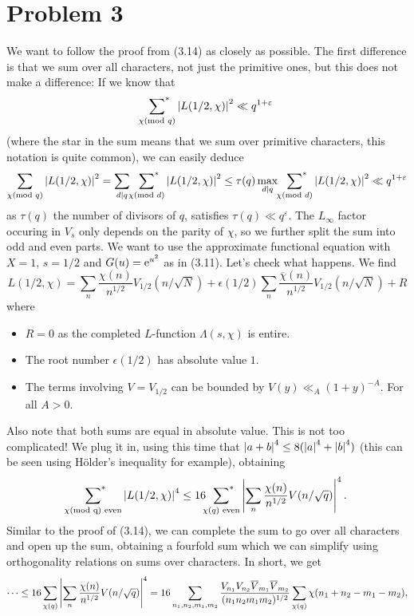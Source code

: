 \documentclass[a4paper,11pt]{article}
\begin{document}
\section*{Problem 3}
We want to follow the proof from (3.14) as closely as possible. The first 
difference is that we sum over all characters, not just the primitive ones, 
but this does not make a difference: If we know that 
\[
    \sideset{}{^*} \sum_{\chi \text{(mod $q$)}} \left\lvert L(1/2, \chi) \right\rvert^2 \ll q^{1+\varepsilon}
\]
(where the star in the sum means that we sum over primitive characters, this 
notation is quite common), we can easily deduce
\[
    \sum_{\chi \text{(mod $q$)}} \left\lvert L(1/2, \chi) \right\rvert^2 
    = \sum_{d \mid q}\sideset{}{^*} \sum_{\chi \text{(mod $d$)}} \left\lvert L(1/2, \chi) \right\rvert^2 
    \leq \tau(q) \max_{d \mid q} \sideset{}{^*} \sum_{\chi \text{(mod $d$)}} \left\lvert L(1/2, \chi) \right\rvert^2 
    \ll q^{1+\varepsilon}
\]
as $\tau(q)$ the number of divisors of $q$, satisfies $\tau(q) \ll q^{\varepsilon}$. 
The $L_\infty$ factor occuring in $V_s$ only depends on the parity of $\chi$, 
so we further split the sum into odd and even parts. We want to use the 
approximate functional equation with $X=1$, $s=1/2$ and $G(u) = \mathrm e^{u^2}$ as in 
(3.11). Let's check what happens. We find
\[
    L(1/2, \chi) = \sum_n \frac{\chi(n)}{n^{1/2}} V_{1/2}(n/\sqrt N)
    +  \epsilon({1/2})\sum_n \frac{\overline\chi(n)}{n^{1/2}} V_{1/2}(n/\sqrt N) + R
\]
where 
\begin{itemize}
    \item $R = 0$ as the completed $L$-function $\Lambda(s, \chi)$ is entire.
    \item The root number $\epsilon(1/2)$ has absolute value $1$. 
    \item The terms involving $V = V_{1/2}$ can be bounded by 
        $V(y) \ll_A (1 + y)^{-A}$. For all $A > 0$. 
\end{itemize}
Also note that both sums are equal in absolute value. This is not too
complicated! We plug it in, using this time that $\left\lvert a+b \right\rvert^4 \leq 8 (\left\lvert a \right\rvert^4 
+ \left\lvert b \right\rvert^4)$ (this can be seen using Hölder's inequality for example),
obtaining 
\[
    \sideset{}{^*} \sum_{\chi \text{(mod q) even}} \left\lvert L(1/2, \chi) \right\rvert^4 
    \leq 16 \sideset{}{^*} \sum_{\chi(q) \text{ even}} \left\lvert \sum_n
    \frac{\chi(n)}{n^{1/2}}V(n/\sqrt q) \right\rvert^4.
\]
Similar to the proof of (3.14), we can complete the sum to go over all characters 
and open up the sum, obtaining a fourfold sum which we can simplify using
orthogonality relations on sums over characters. 
In short, we get
\begin{equation}
    \dots 
    \leq 16 \sum_{\chi (q)} \left\lvert  \sum_n \frac{\chi(n)}{n^{1/2}}V(n/\sqrt q) \right\rvert^4
    = 16 \sum_{n_1, n_2, m_1, m_2} \frac{V_{n_1} V_{n_2} \overline V_{m_1} \overline
V_{m_2}}{(n_1n_2m_1m_2)^{1/2}}
    \sum_{\chi (q)} \chi(n_1+n_2-m_1-m_2),
\end{equation}
\end{document}
